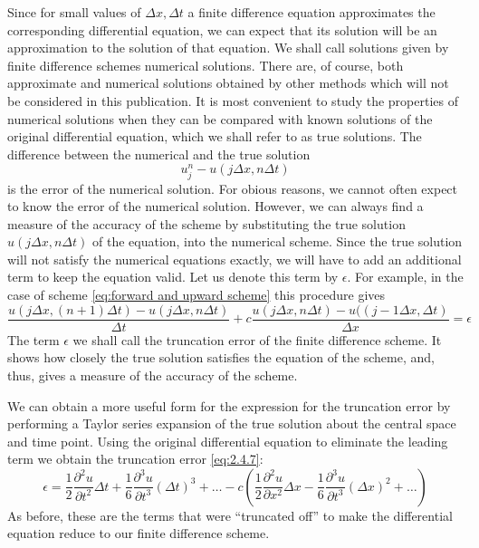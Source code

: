 Since for small values of $\Delta x, \Delta t$ a finite difference equation approximates the corresponding differential equation, we can expect that its solution will be an approximation to the solution of that equation. We shall call solutions given by finite difference schemes numerical solutions. There are, of course, both approximate and numerical solutions obtained by other methods which will not be considered in this publication. It is most convenient to study the properties of numerical solutions when they can be compared with known solutions of the original differential equation, which we shall refer to as true solutions. The difference between the numerical and the true solution
\begin{equation}
	u_j^n-u(j\Delta x,n\Delta t)
\end{equation}
is the error of the numerical solution. For obious reasons, we cannot often expect to know the error of the numerical solution. However, we can always find a measure of the accuracy of the scheme by substituting the true solution $u(j\Delta x, n\Delta t)$ of the equation, into the numerical scheme. Since the true solution will not satisfy the numerical equations exactly, we will have to add an additional term to keep the equation valid. Let us denote this term by $\epsilon$. For example, in the case of scheme \ref{eq:forward and upward scheme} this procedure gives
\begin{equation}\label{eq:2.4.7}
	\frac{u(j\Delta x,(n+1)\Delta t)-u(j\Delta x, n\Delta t)}{\Delta t}+c\frac{u(j\Delta x, n\Delta t)-u((j-1\Delta x, \Delta t)}{\Delta x}=\epsilon
\end{equation}
The term $\epsilon$ we shall call the truncation error of the finite difference scheme. It shows how closely the true solution satisfies the equation of the scheme, and, thus, gives a measure of the accuracy of the scheme.

We can obtain a more useful form for the expression for the truncation error by performing a Taylor series expansion of the true solution about the central space and time point. Using the original differential equation to eliminate the leading term we obtain the truncation error \ref{eq:2.4.7}:
\begin{equation}\label{eq: 2.4.8}
	\epsilon=\frac{1}{2}\frac{\partial^2u}{\partial t^2}\Delta t+\frac{1}{6}\frac{\partial^3u}{\partial t^3}(\Delta t)^3+\dots-c\left(\frac{1}{2}\frac{\partial^2u}{\partial x^2}\Delta x-\frac{1}{6}\frac{\partial^3u}{\partial t^3}(\Delta x)^2+\dots\right)
\end{equation}
As before, these are the terms that were “truncated off” to make the differential equation reduce to our finite difference scheme.

